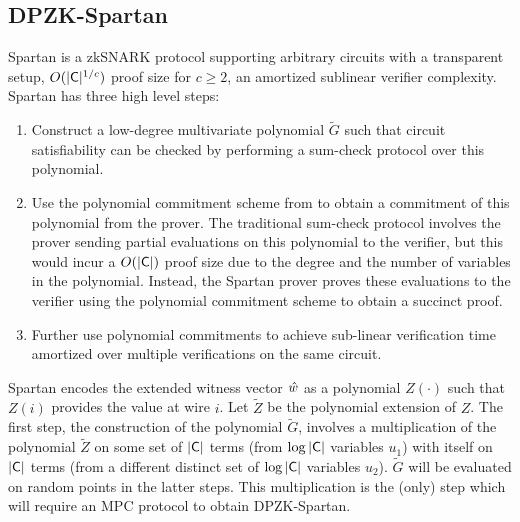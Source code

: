 

\subsection{DPZK-Spartan}\label{subsec:spartan}
Spartan \cite{spartan} is a zkSNARK protocol supporting arbitrary circuits with a transparent setup, $O(|\mathsf{C}|^{1/c})$ proof size for $c \geq 2$, an amortized sublinear verifier complexity. Spartan has three high level steps:
\begin{enumerate}
\item Construct a low-degree multivariate polynomial $\tilde{G}$ such that circuit satisfiability can be checked by performing a sum-check protocol \cite{sumcheck} over this polynomial.
\item Use the polynomial commitment scheme from \cite{hyrax} to obtain a commitment of this polynomial from the prover. The traditional sum-check protocol involves the prover sending partial evaluations on this polynomial to the verifier, but this would incur a $O(|\mathsf{C}|)$ proof size due to the degree and the number of variables in the polynomial. Instead, the Spartan prover proves these evaluations to the verifier using the polynomial commitment scheme to obtain a succinct proof.
\item Further use polynomial commitments to achieve sub-linear verification time amortized over multiple verifications on the same circuit.
\end{enumerate}
Spartan encodes the extended witness vector $\hat{w}$ as a polynomial $Z(\cdot)$ such that $Z(i)$ provides the value at wire $i$. Let $\tilde{Z}$ be the polynomial extension of $Z$.
The first step, the construction of the polynomial $\tilde{G}$, involves a multiplication of the polynomial $\tilde{Z}$ on some set of $|\mathsf{C}|$ terms (from $\log |\mathsf{C}|$ variables $u_1$) with itself on $|\mathsf{C}|$ terms (from a different distinct set of $\log |\mathsf{C}|$ variables $u_2$). $\tilde{G}$ will be evaluated on random points in the latter steps. This multiplication is the (only) step which will require an MPC protocol to obtain DPZK-Spartan. 


